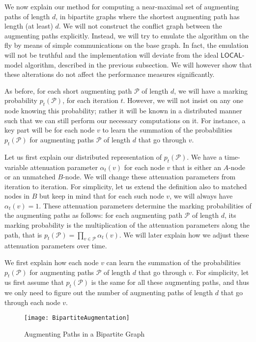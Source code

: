 \documentclass[11pt]{article}
\begin{document}
We now explain our method for computing a near-maximal set of augmenting paths of length $d$, in bipartite graphs where the shortest augmenting path has length (at least) $d$. We will not construct the conflict graph between the augmenting paths explicitly. Instead, we will try to emulate the algorithm on the fly by means of simple communications on the base graph. In fact, the emulation will not be truthful and the implementation will deviate from the ideal $\mathsf{LOCAL}$-model algorithm, described in the previous subsection. We will however show that these alterations do not affect the performance measures significantly.

As before, for each short augmenting path $\mathcal{P}$ of length $d$, we will have a marking probability $p_{t}(\mathcal{P})$, for each iteration $t$. However, we will not insist on any one node knowing this probability; rather it will be known in a distributed manner such that we can still perform our necessary computations on it. For instance, a key part will be for each node $v$ to learn the summation of the probabilities $p_{t}(\mathcal{P})$ for augmenting paths $\mathcal{P}$ of length $d$ that go through $v$.

Let us first explain our distributed representation of $p_{t}(\mathcal{P})$. We have a time-variable attenuation parameter $\alpha_{t}(v)$ for each node $v$ that is either an $A$-node or an unmatched $B$-node. We will change these attenuation parameters from iteration to iteration. For simplicity, let us extend the definition also to matched nodes in $B$ but keep in mind that for each such node $v$, we will always have $\alpha_{t}(v)=1$. These attenuation parameters determine the marking probabilities of the augmenting paths as follows: for each augmenting path $\mathcal{P}$ of length $d$, its marking probability is the multiplication of the attenuation parameters along the path, that is $p_{t}(\mathcal{P})=\prod_{v\in \mathcal{P}} \alpha_{t}(v)$. We will later explain how we adjust these attenuation parameters over time.


We first explain how each node $v$ can learn the summation of the probabilities $p_{t}(\mathcal{P})$ for augmenting paths $\mathcal{P}$ of length $d$ that go through $v$. For simplicity, let us first assume that $p_{t}(\mathcal{P})$ is the same for all these augmenting paths, and thus we only need to figure out the number of augmenting paths of length $d$ that go through each node $v$.

\begin{figure}[t]
	\centering
		\texttt{[image: BipartiteAugmentation]}
	\caption{Augmenting Paths in a Bipartite Graph}
	\label{fig:BipartiteAugmentation}
\end{figure}
\end{document}

